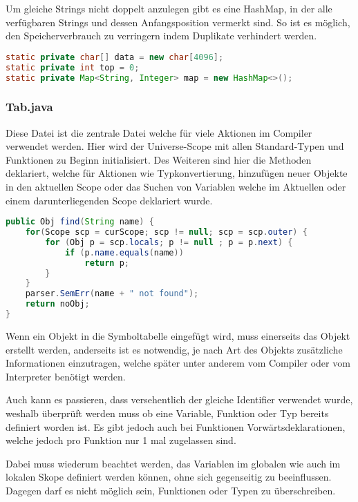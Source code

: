 Um gleiche Strings nicht doppelt anzulegen gibt es eine HashMap, in der alle verf\"ugbaren Strings und dessen Anfangsposition vermerkt sind. So ist es m\"oglich, den Speicherverbrauch zu verringern indem Duplikate verhindert werden.

\begin{lstlisting}[language=Java]
static private char[] data = new char[4096];
static private int top = 0;
static private Map<String, Integer> map = new HashMap<>();
\end{lstlisting}

\subsubsection{Tab.java}

Diese Datei ist die zentrale Datei welche f\"ur viele Aktionen im Compiler verwendet werden. Hier wird der Universe-Scope mit allen Standard-Typen und Funktionen zu Beginn initialisiert. Des Weiteren sind hier die Methoden deklariert, welche f\"ur Aktionen wie Typkonvertierung, hinzuf\"ugen neuer Objekte in den aktuellen Scope oder das Suchen von Variablen welche im Aktuellen oder einem darunterliegenden Scope deklariert wurde.

\begin{lstlisting}[language=Java]
public Obj find(String name) {
	for(Scope scp = curScope; scp != null; scp = scp.outer) {
		for (Obj p = scp.locals; p != null ; p = p.next) {
			if (p.name.equals(name))
				return p;
		}
	}
	parser.SemErr(name + " not found");
	return noObj;
}
\end{lstlisting}


Wenn ein Objekt in die Symboltabelle eingef\"ugt wird, muss einerseits das Objekt erstellt werden, anderseits ist es notwendig, je nach Art des Objekts zus\"atzliche Informationen einzutragen, welche sp\"ater unter anderem vom Compiler oder vom Interpreter ben\"otigt werden.

Auch kann es passieren, dass versehentlich der gleiche Identifier verwendet wurde, weshalb \"uberpr\"uft werden muss ob eine Variable, Funktion oder Typ bereits definiert worden ist. Es gibt jedoch auch bei Funktionen Vorw\"artsdeklarationen, welche jedoch pro Funktion nur 1 mal zugelassen sind.

Dabei muss wiederum beachtet werden, das Variablen im globalen wie auch im lokalen Skope definiert werden k\"onnen, ohne sich gegenseitig zu beeinflussen. Dagegen darf es nicht m\"oglich sein, Funktionen oder Typen zu \"uberschreiben.

